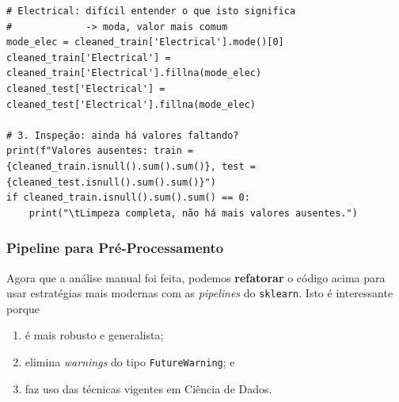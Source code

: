 \documentclass[11pt]{article}
\begin{document}
\begin{enumerate}
\begin{enumerate}
\begin{verbatim}
# Electrical: difícil entender o que isto significa
#             -> moda, valor mais comum
mode_elec = cleaned_train['Electrical'].mode()[0]
cleaned_train['Electrical'] = cleaned_train['Electrical'].fillna(mode_elec)
cleaned_test['Electrical'] = cleaned_test['Electrical'].fillna(mode_elec)

# 3. Inspeção: ainda há valores faltando?
print(f"Valores ausentes: train = {cleaned_train.isnull().sum().sum()}, test = {cleaned_test.isnull().sum().sum()}")
if cleaned_train.isnull().sum().sum() == 0:
    print("\tLimpeza completa, não há mais valores ausentes.")
\end{verbatim}
\end{enumerate}
\end{enumerate}
\subsubsection{Pipeline para Pré-Processamento}
\label{sec:orgaf8528c}
Agora que a análise manual foi feita, podemos \textbf{refatorar} o código acima para usar estratégias mais modernas com as \emph{pipelines} do \texttt{sklearn}. Isto é interessante porque
\begin{enumerate}
\item é mais robusto e generalista;
\item elimina \emph{warnings} do tipo \texttt{FutureWarning}; e
\item faz uso das técnicas vigentes em Ciência de Dados.
\end{enumerate}
\end{document}
